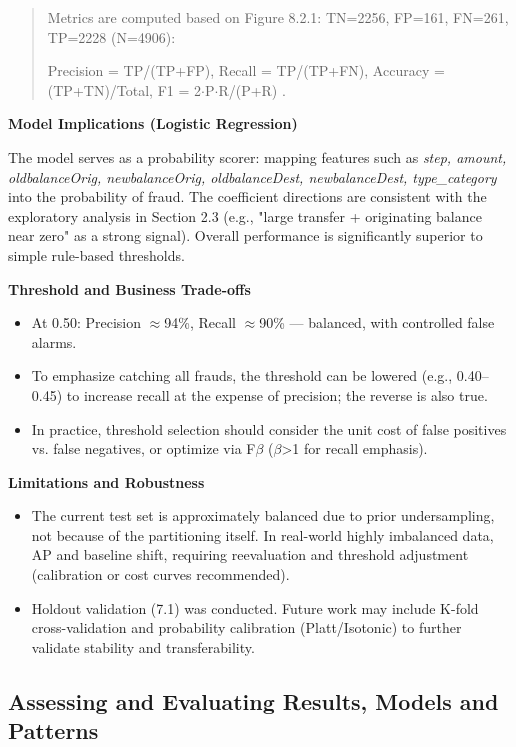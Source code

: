 \documentclass[sigplan,screen]{acmart}
\begin{document}
\begin{quote}
Metrics are computed based on Figure 8.2.1: TN=2256, FP=161, FN=261, TP=2228 (N=4906):

Precision = TP/(TP+FP), Recall = TP/(TP+FN), Accuracy = (TP+TN)/Total, F1 = 2$\cdot$P$\cdot$R/(P+R) \cite{powers2011evaluation}.
\end{quote}

\textbf{Model Implications (Logistic Regression)}

The model serves as a probability scorer: mapping features such as \textit{step, amount, oldbalanceOrig, newbalanceOrig, oldbalanceDest, newbalanceDest, type\_category} into the probability of fraud. The coefficient directions are consistent with the exploratory analysis in Section 2.3 (e.g., "large transfer + originating balance near zero" as a strong signal). Overall performance is significantly superior to simple rule-based thresholds.

\textbf{Threshold and Business Trade-offs}

\begin{itemize}
    \item At 0.50: Precision $\approx$94\%, Recall $\approx$90\% --- balanced, with controlled false alarms.
    \item To emphasize catching all frauds, the threshold can be lowered (e.g., 0.40--0.45) to increase recall at the expense of precision; the reverse is also true.
    \item In practice, threshold selection should consider the unit cost of false positives vs. false negatives, or optimize via F$\beta$ ($\beta$>1 for recall emphasis).
\end{itemize}

\textbf{Limitations and Robustness}

\begin{itemize}
    \item The current test set is approximately balanced due to prior undersampling, not because of the partitioning itself. In real-world highly imbalanced data, AP and baseline shift, requiring reevaluation and threshold adjustment (calibration or cost curves recommended).
    \item Holdout validation (7.1) was conducted. Future work may include K-fold cross-validation and probability calibration (Platt/Isotonic) to further validate stability and transferability.
\end{itemize}

\subsection{Assessing and Evaluating Results, Models and Patterns}
\end{document}

